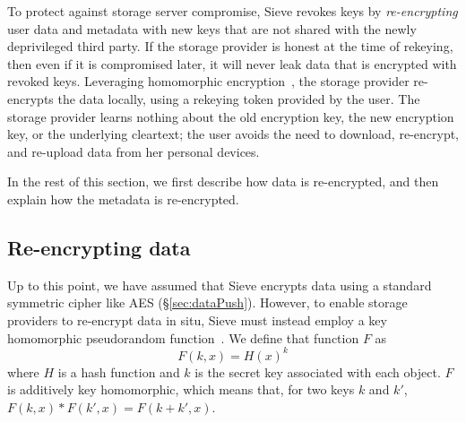 To protect against storage server compromise,
Sieve revokes keys by \emph{re-encrypting}
user data and metadata with new keys that
are not shared with the newly deprivileged
third party. If the storage provider is
honest at the time of rekeying, then even
if it is compromised later, it will never
leak data that is encrypted with revoked
keys.
Leveraging homomorphic encryption~\cite{gentry},
the storage provider re-encrypts the data
locally, using a rekeying token provided
by the user. The storage provider learns
nothing about the old encryption key, the
new encryption key, or the underlying cleartext;
the user avoids the need to download, re-encrypt, and 
re-upload data from her personal devices.

In the rest of this section, we first describe
how data is re-encrypted, and then explain how
the metadata is re-encrypted.

\subsection{Re-encrypting data} Up to this point, 
we have assumed that Sieve 
encrypts data using a standard
symmetric cipher like AES 
(\S\ref{sec:dataPush}). However, to enable storage
providers to re-encrypt data in situ, Sieve
must instead employ a key homomorphic pseudorandom
function~\cite{keyhom, npr99}. We
define that function $F$ as
  \begin{equation*}
    F(k, x) = H(x)^k 
  \end{equation*}
where $H$ is a hash function and $k$ is the
secret key associated with each object. $F$
is additively key homomorphic, which means
that, for two keys $k$ and $k'$,
$F(k,x)*F(k',x) = F(k+k',x)$.

